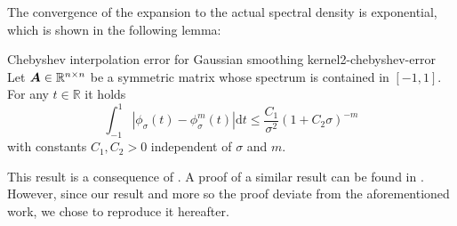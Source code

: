 The convergence of the expansion to the actual spectral density is exponential, 
which is shown in the following lemma:
\begin{lemma}{Chebyshev interpolation error for Gaussian smoothing kernel}{2-chebyshev-error}
    Let $\boldsymbol{A} \in \mathbb{R}^{n \times n}$ be a symmetric matrix whose spectrum
    is contained in $[-1, 1]$. For any $t \in \mathbb{R}$ it holds
    \begin{equation}
        \int_{-1}^{1} \left|  \phi_{\sigma}(t) - \phi_{\sigma}^m(t) \right| \mathrm{d}t \leq \frac{C_1}{\sigma^2}(1 + C_2 \sigma)^{-m}
        \label{equ:2-chebyshev-interpolation-error}
    \end{equation}
    with constants $C_1, C_2 > 0$ independent of $\sigma$ and $m$.
\end{lemma}
This result is a consequence of .
A proof of a similar result can be found in \cite[theorem~2]{lin2017randomized}.
However, since our result and more so the proof deviate from the aforementioned
work, we chose to reproduce it hereafter.

